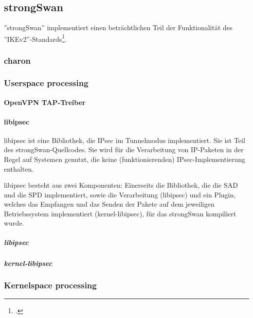 \subsection{strongSwan}
''strongSwan'' implementiert einen beträchtlichen Teil der Funktionalität des ''IKEv2''-Standards\footcite{charlie_kaufman_rfc_2014}.
\subsubsection{charon}
\subsubsection{Userspace processing}
\paragraph{OpenVPN TAP-Treiber}
\paragraph{libipsec}
libipsec ist eine Bibliothek, die IPsec im Tunnelmodus implementiert.
Sie ist Teil des strongSwan-Quellcodes. Sie wird für die Verarbeitung von IP-Paketen
in der Regel auf Systemen genutzt, die keine (funktionierenden) IPsec-Implementierung
enthalten.

libipsec besteht aus zwei Komponenten: Einerseits die Bibliothek, die die SAD und die SPD
implementiert, sowie die Verarbeitung (libipsec) und ein Plugin, welches das Empfangen und das Senden
der Pakete auf dem jeweiligen Betriebssystem implementiert (kernel-libipsec), für das strongSwan kompiliert wurde.

\subparagraph{libipsec}
\subparagraph{kernel-libipsec}

\subsubsection{Kernelspace processing}


